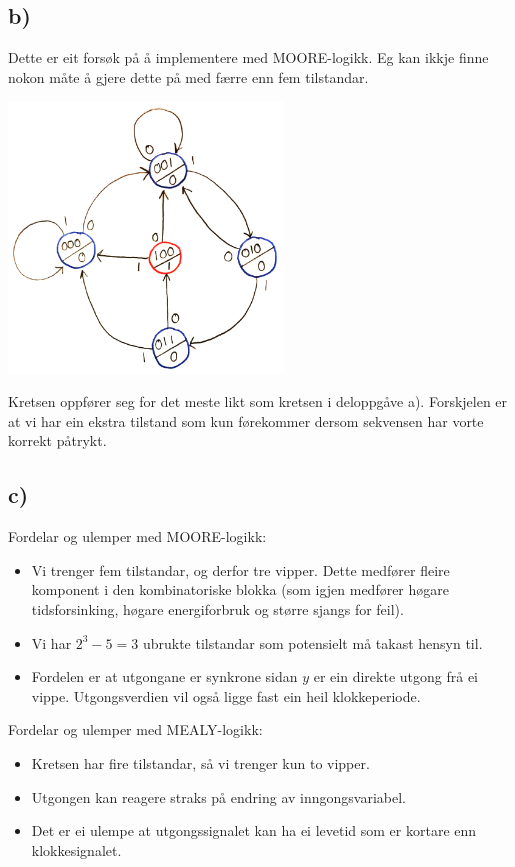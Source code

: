 \documentclass[12pt,a4paper]{article}
\begin{document}
      \newpage 

    \subsection{b)}
      Dette er eit forsøk på å implementere med MOORE-logikk. Eg kan ikkje finne
      nokon måte å gjere dette på med færre enn fem tilstandar.
      \begin{center}
        \includegraphics[width=73mm]{04_3b}
      \end{center}
      Kretsen oppfører seg for det meste likt som kretsen i deloppgåve a).
      Forskjelen er at vi har ein ekstra tilstand som kun førekommer dersom
      sekvensen har vorte korrekt påtrykt.

    \subsection{c)}
      Fordelar og ulemper med MOORE-logikk:
      \begin{itemize}
        \item Vi trenger fem tilstandar, og derfor tre vipper. Dette medfører
          fleire komponent i den kombinatoriske blokka (som igjen medfører
          høgare tidsforsinking, høgare energiforbruk og større sjangs for
          feil).
        \item Vi har $2^3 - 5 = 3$ ubrukte tilstandar som potensielt må takast
          hensyn til.
        \item Fordelen er at utgongane er synkrone sidan $y$ er ein direkte
          utgong frå ei vippe. Utgongsverdien vil også ligge fast ein heil
          klokkeperiode.
      \end{itemize}
      Fordelar og ulemper med MEALY-logikk:
      \begin{itemize}
        \item Kretsen har fire tilstandar, så vi trenger kun to vipper.
        \item Utgongen kan reagere straks på endring av inngongsvariabel.
        \item Det er ei ulempe at utgongssignalet kan ha ei levetid som er
          kortare enn klokkesignalet.
      \end{itemize}
      
\end{document}
